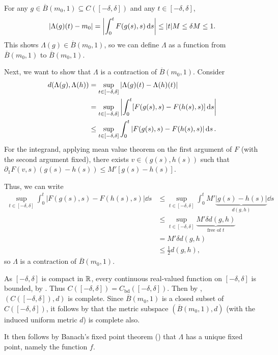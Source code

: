 \begin{enumerate}
\begin{pf}
For any \(g\in\overline{B}(m_0,1)\subseteq C([-\delta,\delta])\) and any
\(t\in[-\delta,\delta]\),
\[
|\Lambda(g)(t)-m_0|
=\qty|\int_{0}^{t}F(g(s),s)\dd{s}|
\le |t|M
\le \delta M
\le 1.
\]
This shows \(\Lambda(g)\in\overline{B}(m_0,1)\), so we can define \(\Lambda\)
as a function from \(\overline{B}(m_0,1)\) to \(\overline{B}(m_0,1)\).

Next, we want to show that \(\Lambda\) is a contraction of
\(\overline{B}(m_0,1)\). Consider
\begin{align*}
d(\Lambda(g),\Lambda(h))
&=\sup_{t\in[-\delta,\delta]}|\Lambda(g)(t)-\Lambda(h)(t)| \\
&=\sup_{t\in[-\delta,\delta]}\qty|\int_{0}^{t}[F(g(s),s)-F(h(s),s)]\dd{s}| \\
&\le\sup_{t\in[-\delta,\delta]}\int_{0}^{t}|F(g(s),s)-F(h(s),s)|\dd{s}.
\end{align*}
For the integrand, applying mean value theorem on the first argument of \(F\)
(with the second argument fixed), there exists \(v\in (g(s),h(s))\) such that
\(\partial_1 F(v,s)(g(s)-h(s))\le M'[g(s)-h(s)]\).

Thus, we can write
\begin{align*}
\sup_{t\in[-\delta,\delta]}\int_{0}^{t}|F(g(s),s)-F(h(s),s)|\dd{s}
&\le\sup_{t\in[-\delta,\delta]}\int_{0}^{t}M'\underbrace{|g(s)-h(s)|}_{d(g,h)}\dd{s} \\
&\le \sup_{t\in[-\delta,\delta]}\underbrace{M'\delta d(g,h)}_{\text{free of \(t\)}} \\
&=M'\delta d(g,h) \\
&\le \frac{1}{2}d(g,h),
\end{align*}
so \(\Lambda\) is a contraction of \(\overline{B}(m_0,1)\).

As \([-\delta,\delta]\) is compact in \(\mathbb{R}\), every continuous real-valued
function on \([-\delta,\delta]\) is bounded, by .
Thus \(C([-\delta,\delta])=C_{\mathrm{bd}}([-\delta,\delta])\). Then by
, \((C([-\delta,\delta]),d)\) is
complete. Since \(\overline{B}(m_0,1)\) is a closed subset of
\(C([-\delta,\delta])\), it follows by  that
the metric subspace \((\overline{B}(m_0,1),d)\) (with the induced uniform
metric \(d\)) is complete also.

It then follows by Banach's fixed point theorem ()
that \(\Lambda\) has a unique fixed point, namely the function \(f\).
\end{pf}

\end{enumerate}

